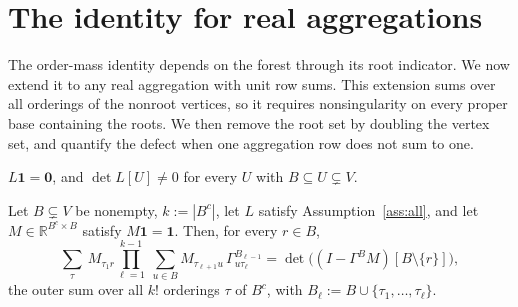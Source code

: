 \documentclass[onefignum,onetabnum,nohypdvips]{siamart250211}
\numberwithin{theorem}{section}
\numberwithin{equation}{section}
\newcommand{\R}{\mathbb{R}}
\newcommand{\one}{\mathbf{1}}
\newcommand{\zero}{\mathbf{0}}
\begin{document}
\section{The identity for real aggregations}\label{sec:sm-algebra}

The order-mass identity depends on the forest through its root
indicator. We now extend it to any real aggregation with unit row
sums. This extension sums over all orderings of the nonroot vertices,
so it requires nonsingularity on every proper base containing the
roots. We then remove the root set by doubling the vertex set, and
quantify the defect when one aggregation row does not sum to one.

\begin{assumption}\label{ass:all}
$L\one=\zero$, and $\det L[U]\ne0$ for every $U$ with
$B\subseteq U\subsetneq V$.
\end{assumption}

\begin{corollary}\label{cor:soft}
Let $B\subsetneq V$ be nonempty, $k:=|B^c|$, let $L$ satisfy
Assumption~\ref{ass:all}, and let $M\in\R^{B^c\times B}$ satisfy $M\one=\one$.
Then, for every $r\in B$,
\begin{equation}\label{eq:soft}
\sum_{\tau}\ M_{\tau_1 r}\prod_{\ell=1}^{k-1}\
\sum_{u\in B}M_{\tau_{\ell+1}u}\,\Gamma^{B_{\ell-1}}_{u\tau_\ell}
=\det\big((I-\Gamma^BM)[B\setminus\{r\}]\big),
\end{equation}
the outer sum over all $k!$ orderings $\tau$ of $B^c$, with
$B_\ell:=B\cup\{\tau_1,\dots,\tau_\ell\}$.
\end{corollary}
\end{document}
